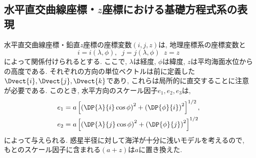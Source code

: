 \subsection{水平直交曲線座標・$z$座標における基礎方程式系の表現}
水平直交曲線座標・鉛直$z$座標の座標変数$(i,j,z)$は, 
地理座標系の座標変数と
\begin{equation*}
 i = i(\lambda,\phi), \;\; j = j(\lambda,\phi) \;\; z=z
\end{equation*}
によって関係付けられるとする. 
ここで, $\lambda$は経度, $\phi$は緯度, $z$は平均海面水位からの高度である. 
それぞれの方向の単位ベクトルは前に定義した$\Dvect{i}, \Dvect{j}, \Dvect{k}$であり,  
これらは局所的に直交することに注意が必要である. 
このとき, 水平方向のスケール因子$e_1, e_2, e_3$は, 
\begin{equation*}
\begin{split}
  e_1 &= a \left[ \left(\DP{\lambda}{i} \cos\phi \right)^2 + \left(\DP{\phi}{i}\right)^2 \right]^{1/2}, \\ 
  e_2 &= a \left[ \left(\DP{\lambda}{j} \cos\phi \right)^2 + \left(\DP{\phi}{j}\right)^2 \right]^{1/2}
\end{split}
\end{equation*}
によって与えられる. 
惑星半径に対して海洋が十分に浅いモデルを考えるので, もとのスケール因子に含まれる$(a+z)$は$a$に置き換えた. 

